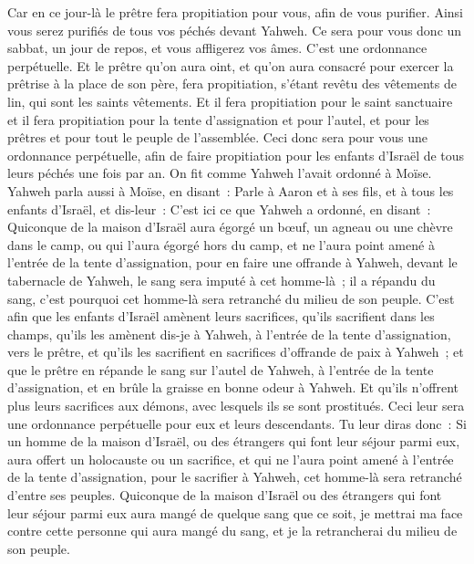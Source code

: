 \begin{multicols}{2}
Car en ce jour-là le prêtre fera propitiation pour vous, afin de vous purifier. Ainsi vous serez purifiés de tous vos péchés devant Yahweh.
Ce sera pour vous donc un sabbat, un jour de repos, et vous affligerez vos âmes. C'est une ordonnance perpétuelle.
Et le prêtre qu'on aura oint, et qu'on aura consacré pour exercer la prêtrise à la place de son père, fera propitiation, s'étant revêtu des vêtements de lin, qui sont les saints vêtements.
Et il fera propitiation pour le saint sanctuaire et il fera propitiation pour la tente d'assignation et pour l'autel, et pour les prêtres et pour tout le peuple de l'assemblée.
Ceci donc sera pour vous une ordonnance perpétuelle, afin de faire propitiation pour les enfants d'Israël de tous leurs péchés une fois par an. On fit comme Yahweh l'avait ordonné à Moïse.
\VerseOne{}Yahweh parla aussi à Moïse, en disant~:
Parle à Aaron et à ses fils, et à tous les enfants d'Israël, et dis-leur~: C'est ici ce que Yahweh a ordonné, en disant~:
Quiconque de la maison d'Israël aura égorgé un bœuf, un agneau ou une chèvre dans le camp, ou qui l'aura égorgé hors du camp,
et ne l'aura point amené à l'entrée de la tente d'assignation, pour en faire une offrande à Yahweh, devant le tabernacle de Yahweh, le sang sera imputé à cet homme-là~; il a répandu du sang, c'est pourquoi cet homme-là sera retranché du milieu de son peuple.
C'est afin que les enfants d'Israël amènent leurs sacrifices, qu'ils sacrifient dans les champs, qu'ils les amènent dis-je à Yahweh, à l'entrée de la tente d'assignation, vers le prêtre, et qu'ils les sacrifient en sacrifices d'offrande de paix à Yahweh~;
et que le prêtre en répande le sang sur l'autel de Yahweh, à l'entrée de la tente d'assignation, et en brûle la graisse en bonne odeur à Yahweh.
Et qu'ils n'offrent plus leurs sacrifices aux démons, avec lesquels ils se sont prostitués. Ceci leur sera une ordonnance perpétuelle pour eux et leurs descendants.
Tu leur diras donc~: Si un homme de la maison d'Israël, ou des étrangers qui font leur séjour parmi eux, aura offert un holocauste ou un sacrifice,
et qui ne l'aura point amené à l'entrée de la tente d'assignation, pour le sacrifier à Yahweh, cet homme-là sera retranché d'entre ses peuples.
Quiconque de la maison d'Israël ou des étrangers qui font leur séjour parmi eux aura mangé de quelque sang que ce soit, je mettrai ma face contre cette personne qui aura mangé du sang, et je la retrancherai du milieu de son peuple.

\end{multicols}
